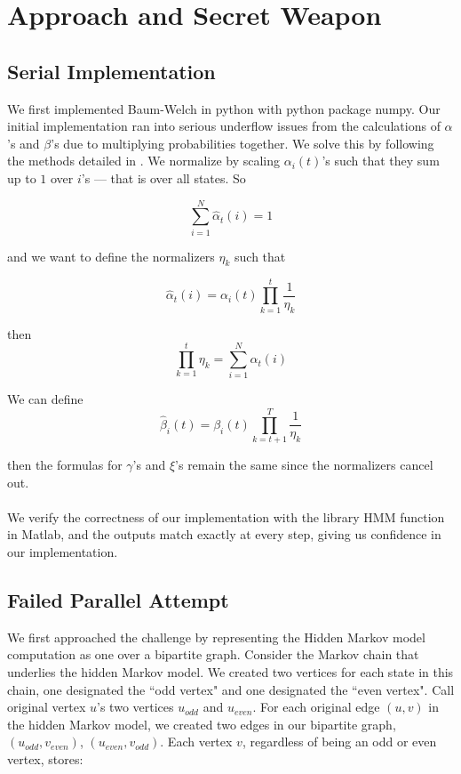 \section{Approach and Secret Weapon}

\subsection{Serial Implementation}
We first implemented Baum-Welch in python with python package numpy. Our initial implementation ran into serious underflow issues from the calculations of $\alpha$'s and $\beta$'s due to multiplying probabilities together. We solve this by following the methods detailed in \cite{normalizer}. We normalize by scaling $\alpha_i(t)$'s such that they sum up to $1$ over $i$'s --- that is over all states. So 

\begin{equation} 
\sum_{i=1}^N \hat{\alpha}_t(i) = 1
\end{equation}

and we want to define the normalizers $\eta_k$ such that

\begin{equation} 
    \hat{\alpha}_t(i) = \alpha_i(t) \prod_{k=1}^t \frac{1}{\eta_k}
\end{equation}

then 
\begin{equation}
\prod_{k=1}^t \eta_k =\sum_{i=1}^N \alpha_t(i)
\end{equation}

We can define 
\begin{equation} 
    \hat{\beta}_{i}(t) = \beta_{i}(t) \prod_{k=t+1}^T \frac{1}{\eta_k}
\end{equation}

then the formulas for $\gamma$'s and $\xi$'s remain the same since the normalizers cancel out.
\\
\\
We verify the correctness of our implementation with the library HMM function in Matlab, and the outputs match exactly at every step, giving us confidence in our implementation. 


\subsection{Failed Parallel Attempt}
We first approached the challenge by representing the Hidden Markov model computation as one over a bipartite graph.  Consider the Markov chain that underlies the hidden Markov model.  We created two vertices for each state in this chain, one designated the ``odd vertex" and one designated the ``even vertex".  Call original vertex $u$'s two vertices $u_{odd}$ and $u_{even}$. For each original edge $(u, v)$ in the hidden Markov model, we created two edges in our bipartite graph, $(u_{odd}, v_{even})$, $(u_{even}, v_{odd})$.   Each vertex $v$, regardless of being an odd or even vertex, stores: 

